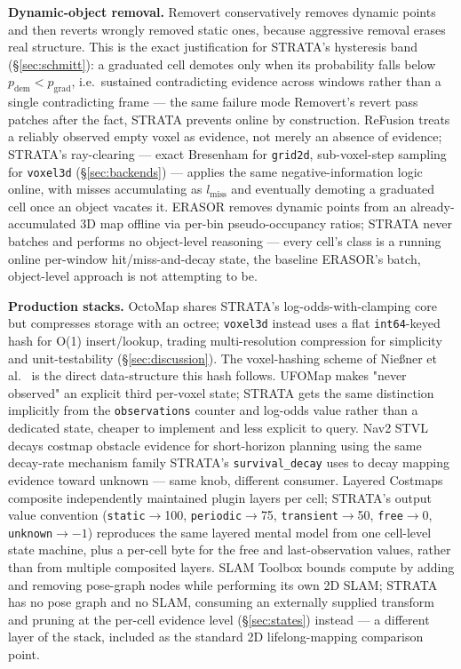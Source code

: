 \documentclass[conference]{IEEEtran}
\begin{document}
\textbf{Dynamic-object removal.} Removert \cite{kim2020removert} conservatively
removes dynamic points and then reverts wrongly removed static ones, because
aggressive removal erases real structure. This is the exact justification for
STRATA's hysteresis band (\S\ref{sec:schmitt}): a graduated cell demotes only when its
probability falls below $p_{\text{dem}} < p_{\text{grad}}$, i.e.\ sustained contradicting
evidence across windows rather than a single contradicting frame --- the same
failure mode Removert's revert pass patches after the fact, STRATA prevents
online by construction. ReFusion \cite{palazzolo2019refusion} treats a reliably
observed empty voxel as evidence, not merely an absence of evidence; STRATA's
ray-clearing --- exact Bresenham for \texttt{grid2d}, sub-voxel-step sampling for
\texttt{voxel3d} (\S\ref{sec:backends}) --- applies the same negative-information logic online, with
misses accumulating as $l_{\text{miss}}$ and eventually demoting a graduated cell once
an object vacates it. ERASOR \cite{lim2021erasor} removes dynamic points from an
already-accumulated 3D map offline via per-bin pseudo-occupancy ratios; STRATA
never batches and performs no object-level reasoning --- every cell's class is
a running online per-window hit/miss-and-decay state, the baseline ERASOR's
batch, object-level approach is not attempting to be.

\textbf{Production stacks.} OctoMap \cite{hornung2013octomap} shares STRATA's
log-odds-with-clamping core but compresses storage with an octree; \texttt{voxel3d}
instead uses a flat \texttt{int64}-keyed hash for O(1) insert/lookup, trading
multi-resolution compression for simplicity and unit-testability (\S\ref{sec:discussion}). The
voxel-hashing scheme of Nie{\ss}ner et al.\ \cite{niessner2013hashing} is the direct
data-structure this hash follows. UFOMap \cite{duberg2020ufomap} makes "never
observed" an explicit third per-voxel state; STRATA gets the same distinction
implicitly from the \texttt{observations} counter and log-odds value rather than a
dedicated state, cheaper to implement and less explicit to query. Nav2 STVL
\cite{macenski2020stvl} decays costmap obstacle evidence for short-horizon
planning using the same decay-rate mechanism family STRATA's
\texttt{survival\_decay} uses to decay mapping evidence toward unknown --- same knob,
different consumer. Layered Costmaps \cite{lu2014layered} composite independently
maintained plugin layers per cell; STRATA's output value convention
(\texttt{static}$\to$100, \texttt{periodic}$\to$75, \texttt{transient}$\to$50, \texttt{free}$\to$0, \texttt{unknown}$\to{-}1$)
reproduces the same layered mental model from one cell-level state machine,
plus a per-cell byte for the free and last-observation values, rather than from
multiple composited layers. SLAM Toolbox \cite{macenski2021slamtoolbox}
bounds compute by adding and removing pose-graph nodes while performing its
own 2D SLAM; STRATA has no pose graph and no SLAM, consuming an externally
supplied transform and pruning at the per-cell evidence level (\S\ref{sec:states}) instead
--- a different layer of the stack, included as the standard 2D lifelong-mapping
comparison point.
\end{document}
